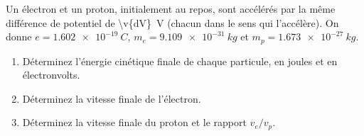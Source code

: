 Un électron et un proton, initialement au repos, sont accélérés par la même différence de potentiel de \qty{\v{dV}}{V} (chacun dans le sens qui l'accélère). On donne $e = \qty{1.602e-19}{C}$, $m_e = \qty{9.109e-31}{kg}$ et $m_p = \qty{1.673e-27}{kg}$.

\begin{enumerate}[label=\alph*)]
    \item Déterminez l'énergie cinétique finale de chaque particule, en joules et en électronvolts.
    \item Déterminez la vitesse finale de l'électron.
    \item Déterminez la vitesse finale du proton et le rapport $v_e / v_p$.
\end{enumerate}
